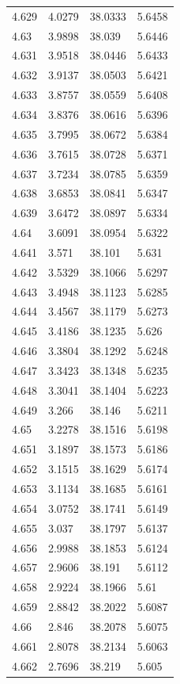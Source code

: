 \begin{tabular}{llll}
4.629 & 4.0279 & 38.0333 & 5.6458 \\
4.63 & 3.9898 & 38.039 & 5.6446 \\
4.631 & 3.9518 & 38.0446 & 5.6433 \\
4.632 & 3.9137 & 38.0503 & 5.6421 \\
4.633 & 3.8757 & 38.0559 & 5.6408 \\
4.634 & 3.8376 & 38.0616 & 5.6396 \\
4.635 & 3.7995 & 38.0672 & 5.6384 \\
4.636 & 3.7615 & 38.0728 & 5.6371 \\
4.637 & 3.7234 & 38.0785 & 5.6359 \\
4.638 & 3.6853 & 38.0841 & 5.6347 \\
4.639 & 3.6472 & 38.0897 & 5.6334 \\
4.64 & 3.6091 & 38.0954 & 5.6322 \\
4.641 & 3.571 & 38.101 & 5.631 \\
4.642 & 3.5329 & 38.1066 & 5.6297 \\
4.643 & 3.4948 & 38.1123 & 5.6285 \\
4.644 & 3.4567 & 38.1179 & 5.6273 \\
4.645 & 3.4186 & 38.1235 & 5.626 \\
4.646 & 3.3804 & 38.1292 & 5.6248 \\
4.647 & 3.3423 & 38.1348 & 5.6235 \\
4.648 & 3.3041 & 38.1404 & 5.6223 \\
4.649 & 3.266 & 38.146 & 5.6211 \\
4.65 & 3.2278 & 38.1516 & 5.6198 \\
4.651 & 3.1897 & 38.1573 & 5.6186 \\
4.652 & 3.1515 & 38.1629 & 5.6174 \\
4.653 & 3.1134 & 38.1685 & 5.6161 \\
4.654 & 3.0752 & 38.1741 & 5.6149 \\
4.655 & 3.037 & 38.1797 & 5.6137 \\
4.656 & 2.9988 & 38.1853 & 5.6124 \\
4.657 & 2.9606 & 38.191 & 5.6112 \\
4.658 & 2.9224 & 38.1966 & 5.61 \\
4.659 & 2.8842 & 38.2022 & 5.6087 \\
4.66 & 2.846 & 38.2078 & 5.6075 \\
4.661 & 2.8078 & 38.2134 & 5.6063 \\
4.662 & 2.7696 & 38.219 & 5.605 \\

\end{tabular}
